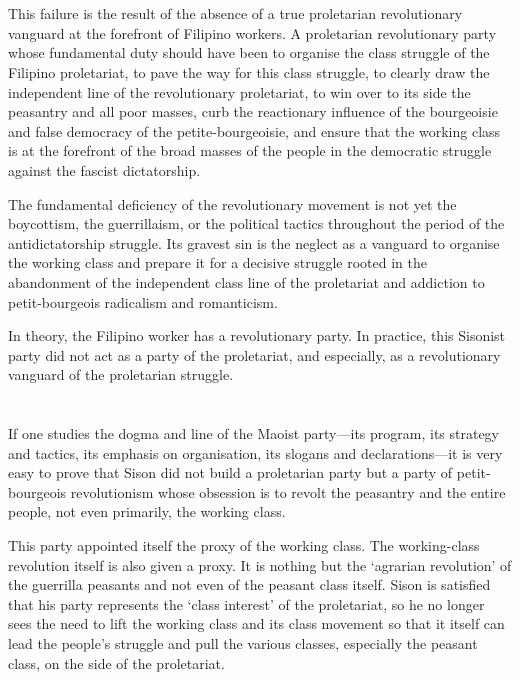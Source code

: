\section{}
This failure 
is the result 
of the absence 
of a true proletarian revolutionary vanguard
at the forefront of Filipino workers.
A proletarian revolutionary party whose fundamental duty should have been
to organise the class struggle of the Filipino proletariat, 
to pave the way for this class struggle, 
to clearly draw the independent line of the revolutionary proletariat, 
to win over to its side the peasantry and all poor masses, 
curb the reactionary influence of the bourgeoisie 
and false democracy of the petite-bourgeoisie, 
and ensure that the working class 
is at the forefront of the broad masses of the people 
in the democratic struggle against the fascist dictatorship.

The fundamental deficiency of the revolutionary movement 
is not yet the boycottism, 
the guerrillaism, 
or the political tactics 
throughout the period of the antidictatorship struggle. 
Its gravest sin 
is the neglect as a vanguard 
to organise the working class 
and prepare it for a decisive struggle 
rooted in the abandonment of the independent class line of the proletariat
and addiction to petit-bourgeois radicalism and romanticism.

In theory,
the Filipino worker has a revolutionary party.
In practice,
this Sisonist party 
did not act as a party of the proletariat,
and especially,
as a revolutionary vanguard of the proletarian struggle.


\section{}
If one studies the dogma and line of the Maoist party---its program, 
its strategy and tactics, 
its emphasis on organisation, 
its slogans and declarations---it 
is very easy to prove that Sison 
did not build a proletarian party 
but a party of petit-bourgeois revolutionism 
whose obsession is to revolt the peasantry and the entire people, 
not even primarily, the working class.

This party appointed itself the proxy of the working class. 
The working-class revolution itself is also given a proxy. 
It is nothing but the `agrarian revolution' 
of the guerrilla peasants 
and not even of the peasant class itself. 
Sison is satisfied that his party represents 
the `class interest' of the proletariat, 
so he no longer sees the need to lift 
the working class and its class movement 
so that it itself can lead the people's struggle 
and pull the various classes, 
especially the peasant class, 
on the side of the proletariat.

